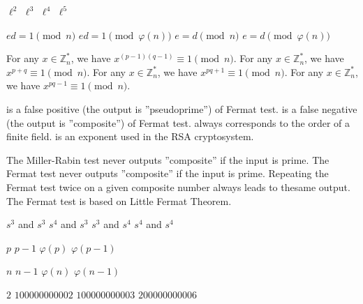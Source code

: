 %
{$\ell^2$}%
{$\ell^3$}%
{$\ell^4$}%
{$\ell^5$}%

%
{$ed=1 \pmod{n}$}%
{$ed=1 \pmod{\varphi(n)}$}%
{$e=d \pmod{n}$}%
{$e=d \pmod{\varphi(n)}$}%
 
{For any $x \in \mathbb{Z}_n^*$, we have $x^{(p-1)(q-1)} \equiv 1 \pmod{n}$. }
{For any $x \in \mathbb{Z}_n^*$, we have $x^{p+q} \equiv 1 \pmod{n}$. }
{For any $x \in \mathbb{Z}_n^*$, we have $x^{pq+1} \equiv 1 \pmod{n}$. }
{For any $x \in \mathbb{Z}_n^*$, we have $x^{pq-1} \equiv 1 \pmod{n}$. }


{is a false positive (the output is ''pseudoprime'') of Fermat test.}
{is a false negative (the output is ''composite'') of Fermat test.}
{always corresponds to the order of a finite field.}
{is an exponent used in the RSA cryptosystem.}

{The Miller-Rabin test never outputs ''composite'' if the input is prime.}
{The Fermat test never outputs ''composite'' if the input is prime.}
{Repeating the Fermat test twice on a given composite number always leads to thesame output.}
{The Fermat test is based on Little Fermat Theorem.}


{$s^3$ and $s^3$} 
{$s^4$ and $s^3$}
 {$s^3$ and $s^4$}
 {$s^4$ and $s^4$}

{$p$} 
{$p-1$}
{$\varphi(p)$}
 {$\varphi(p-1)$}
 
{$n$} 
{$n-1$}
{$\varphi(n)$}
 {$\varphi(n-1)$}
 
{$2$} 
{$100000000002$}
{$100000000003$}
{$200000000006$}
 
